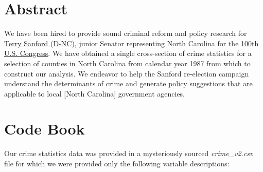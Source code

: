 
%
%
\section{Abstract}
\label{sec:Introduction}

We have been hired to provide sound criminal reform and policy research for \href{https://en.wikipedia.org/wiki/Terry_Sanford}{Terry Sanford (D-NC)}, junior Senator representing North Carolina for the \href{https://en.wikipedia.org/wiki/100th_United_States_Congress}{100th U.S. Congress}.  We have obtained a single cross-section of crime statistics for a selection of counties in North Carolina from calendar year 1987 from which to construct our analysis.  We endeavor to help the Sanford re-election campaign understand the determinants of crime and generate policy suggestions that are applicable to local [North Carolina] government agencies.

\section{Code Book}
\label{sec:Code Book}
Our crime statistics data was provided in a mysteriously sourced \textit{crime\_v2.csv} file for which we were provided only the following variable descriptions:

